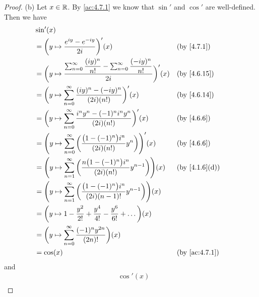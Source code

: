 \begin{proof}{(b)}
  Let \(x \in \mathbb{R}\).
  By \cref{ac:4.7.1} we know that \(\sin'\) and \(\cos'\) are well-defined.
  Then we have
  \begin{align*}
     & \sin'(x)                                                                                                                                                     \\
     & = \bigg(y \mapsto \dfrac{e^{i y} - e^{- i y}}{2i}\bigg)'(x)                                                                 &  & \text{(by \cref{4.7.1})}    \\
     & = \bigg(y \mapsto \dfrac{\sum_{n = 0}^\infty \dfrac{(i y)^n}{n!} - \sum_{n = 0}^\infty \dfrac{(- i y)^n}{n!}}{2i}\bigg)'(x) &  & \text{(by \cref{4.6.15})}   \\
     & = \bigg(y \mapsto \sum_{n = 0}^\infty \dfrac{(i y)^n - (- i y)^n}{(2i) (n!)}\bigg)'(x)                                      &  & \text{(by \cref{4.6.14})}   \\
     & = \bigg(y \mapsto \sum_{n = 0}^\infty \dfrac{i^n y^n - (-1)^n i^n y^n}{(2i) (n!)}\bigg)'(x)                                 &  & \text{(by \cref{4.6.6})}    \\
     & = \Bigg(y \mapsto \sum_{n = 0}^\infty \bigg(\dfrac{\big(1 - (-1)^n\big) i^n}{(2i) (n!)} y^n\bigg)\Bigg)'(x)                 &  & \text{(by \cref{4.6.6})}    \\
     & = \Bigg(y \mapsto \sum_{n = 1}^\infty \bigg(\dfrac{n \big(1 - (-1)^n\big) i^n}{(2i) (n!)} y^{n - 1}\bigg)\Bigg)(x)          &  & \text{(by \cref{4.1.6}(d))} \\
     & = \Bigg(y \mapsto \sum_{n = 1}^\infty \bigg(\dfrac{\big(1 - (-1)^n\big) i^n}{(2i) (n - 1)!} y^{n - 1}\bigg)\Bigg)(x)                                         \\
     & = \bigg(y \mapsto 1 - \dfrac{y^2}{2!} + \dfrac{y^4}{4!} - \dfrac{y^6}{6!} + \dots\bigg)(x)                                                                   \\
     & = \bigg(y \mapsto \sum_{n = 0}^\infty \dfrac{(-1)^n y^{2n}}{(2n)!}\bigg)(x)                                                                                  \\
     & = \cos(x)                                                                                                                   &  & \text{(by \cref{ac:4.7.1})}
  \end{align*}
  and
  \begin{align*}
     & \cos'(x)                                                                                                                                                    \\

\end{align*}
\end{proof}
